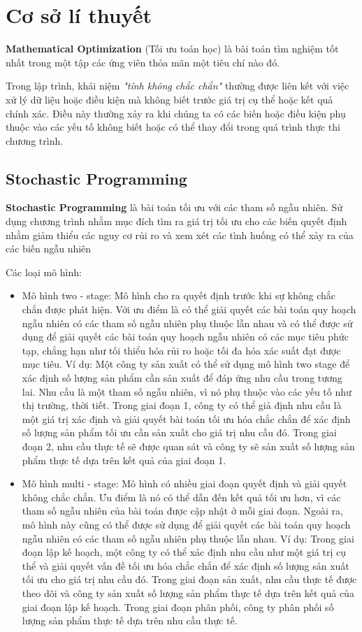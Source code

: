 \documentclass[a4paper]{article}
\begin{document}

\newpage
\tableofcontents
\newpage
\section{Cơ sở lí thuyết}

{\textbf{Mathematical Optimization} (Tối ưu toán học) là bài toán tìm nghiệm tốt nhất trong một tập các ứng viên thỏa mãn một tiêu chí nào đó. }

{Trong lập trình, khái niệm \textit{"tính không chắc chắn"} thường được liên kết với việc xử lý dữ liệu hoặc điều kiện mà không biết trước giá trị cụ thể hoặc kết quả chính xác. Điều này thường xảy ra khi chúng ta có các biến hoặc điều kiện phụ thuộc vào các yếu tố không biết hoặc có thể thay đổi trong quá trình thực thi chương trình.}
\subsection{Stochastic Programming}
{\textbf{Stochastic Programming} là bài toán tối ưu với các tham số ngẫu nhiên. Sử dụng chương trình nhằm mục đích tìm ra giá trị tối ưu cho các biến quyết định nhằm giảm thiểu các nguy cơ rủi ro và xem xét các tình huống có thể xảy ra của các biến ngẫu nhiên}

{Các loại mô hình:}
\begin{itemize}
    \item Mô hình two - stage: Mô hình cho ra quyết định trước khi sự không chắc chắn được phát hiện. Với ưu điểm là có thể giải quyết các bài toán quy hoạch ngẫu nhiên có các tham số ngẫu nhiên phụ thuộc lẫn nhau và có thể được sử dụng để giải quyết các bài toán quy hoạch ngẫu nhiên có các mục tiêu phức tạp, chẳng hạn như tối thiểu hóa rủi ro hoặc tối đa hóa xác suất đạt được mục tiêu. Ví dụ: Một công ty sản xuất có thể sử dụng mô hình two stage để xác định số lượng sản phẩm cần sản xuất để đáp ứng nhu cầu trong tương lai. Nhu cầu là một tham số ngẫu nhiên, vì nó phụ thuộc vào các yếu tố như thị trường, thời tiết. Trong giai đoạn 1, công ty có thể giả định nhu cầu là một giá trị xác định và giải quyết bài toán tối ưu hóa chắc chắn để xác định số lượng sản phẩm tối ưu cần sản xuất cho giá trị nhu cầu đó. Trong giai đoạn 2, nhu cầu thực tế sẽ được quan sát và công ty sẽ sản xuất số lượng sản phẩm thực tế dựa trên kết quả của giai đoạn 1.
    \item Mô hình multi - stage: Mô hình có nhiều giai đoạn quyết định và giải quyết không chắc chắn. Ưu điểm là nó có thể dẫn đến kết quả tối ưu hơn, vì các tham số ngẫu nhiên của bài toán được cập nhật ở mỗi giai đoạn. Ngoài ra, mô hình này cũng có thể được sử dụng để giải quyết các bài toán quy hoạch ngẫu nhiên có các tham số ngẫu nhiên phụ thuộc lẫn nhau. Ví dụ: Trong giai đoạn lập kế hoạch, một công ty có thể xác định nhu cầu như một giá trị cụ thể và giải quyết vấn đề tối ưu hóa chắc chắn để xác định số lượng sản xuất tối ưu  cho giá trị nhu cầu đó. Trong giai đoạn sản xuất, nhu cầu thực tế  được theo dõi và công ty sản xuất số lượng sản phẩm thực tế dựa trên kết quả của giai đoạn lập kế hoạch. Trong giai đoạn phân phối, công ty  phân phối số lượng sản phẩm thực tế dựa trên nhu cầu thực tế.
\end{itemize}
\end{document}
